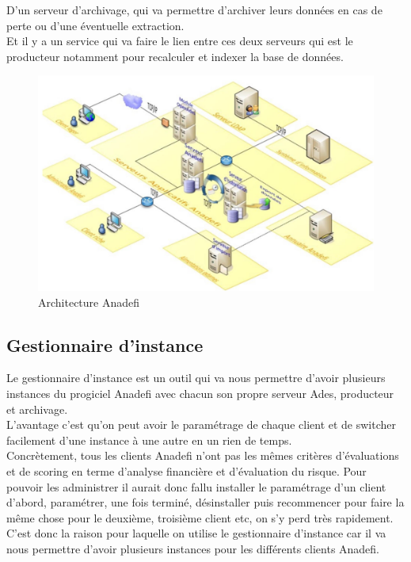 D'un serveur d'archivage, qui va permettre d'archiver leurs données en cas de perte ou d'une éventuelle extraction.\\

Et il y a un service qui va faire le lien entre ces deux serveurs qui est le producteur notamment pour recalculer et indexer la base de données.\\

\begin{figure}[h]
\centering
\includegraphics[scale=0.6]{resources/architecture.png}
\caption{Architecture Anadefi}
\label{ArchiAnadefi}
\end{figure}

\subsection{Gestionnaire d'instance}

Le gestionnaire d'instance est un outil qui va nous permettre d'avoir plusieurs instances du progiciel Anadefi avec chacun son propre serveur Ades, producteur et archivage.\\

L'avantage c'est qu'on peut avoir le paramétrage de chaque client et de switcher facilement d'une instance à une autre en un rien de temps.\\

Concrètement, tous les clients Anadefi n'ont pas les mêmes critères d'évaluations et de scoring en terme d'analyse financière et d'évaluation du risque. Pour pouvoir les administrer il aurait donc fallu installer le paramétrage d'un client d'abord, paramétrer, une fois terminé, désinstaller puis recommencer pour faire la même chose pour le deuxième, troisième client etc, on s'y perd très rapidement. C'est donc la raison pour laquelle on utilise le gestionnaire d'instance car il va nous permettre d'avoir plusieurs instances pour les différents clients Anadefi.

